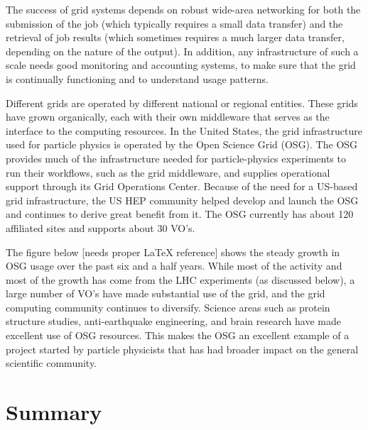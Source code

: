 The success of grid systems depends on robust wide-area networking for both the submission of the job (which typically requires a small data transfer) and the retrieval of job results (which sometimes requires a much larger data transfer, depending on the nature of the output).  In addition, any infrastructure of such a scale needs good monitoring and accounting systems, to make sure that the grid is continually functioning and to understand usage patterns.

Different grids are operated by different national or regional entities.  These grids have grown organically, each with their own middleware that serves as the interface to the computing resources.  In the United States, the grid infrastructure used for particle physics is operated by the Open Science Grid (OSG).  The OSG provides much of the infrastructure needed for particle-physics experiments to run their workflows, such as the grid middleware, and supplies operational support through its Grid Operations Center.  Because of the need for a US-based grid infrastructure, the US HEP community helped develop and launch the OSG and continues to derive great benefit from it.  The OSG currently has about 120 affiliated sites and supports about 30 VO’s.  

The figure below [needs proper LaTeX reference] shows the steady growth in OSG usage over the past six and a half years.  While most of the activity and most of the growth has come from the LHC experiments (as discussed below), a large number of VO’s have made substantial use of the grid, and the grid computing community continues to diversify.  Science areas such as protein structure studies, anti-earthquake engineering, and brain research have made excellent use of OSG resources.  This makes the OSG an excellent example of a project started by particle physicists that has had broader impact on the general scientific community. 


\section{Summary}
\label{sec:comp-summary}




